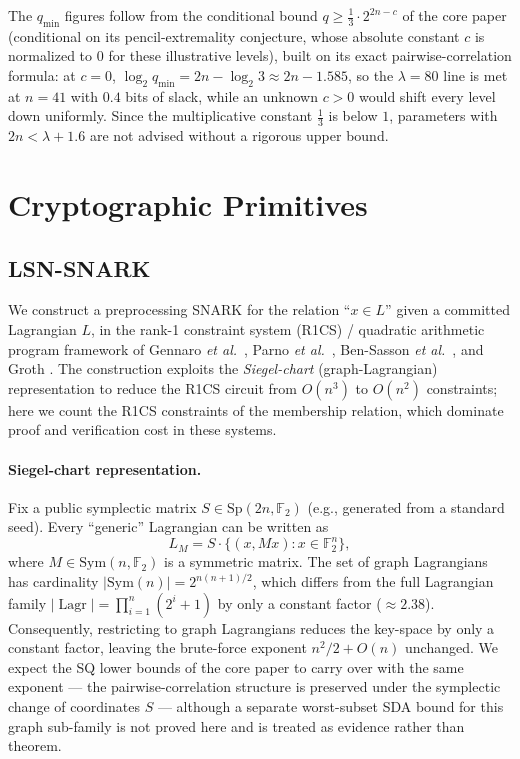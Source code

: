 \documentclass[11pt,a4paper]{article}
\theoremstyle{plain}
\theoremstyle{definition}
\newcommand{\F}{\mathbb{F}}
\DeclareMathOperator{\Lagr}{Lagr}
\newcommand{\etal}{\textit{et al.}}
\begin{document}
The $q_{\min}$ figures follow from the conditional bound $q \ge \tfrac13 \cdot 2^{2n-c}$ of the core paper (conditional on its pencil-extremality conjecture, whose absolute constant $c$ is normalized to $0$ for these illustrative levels), built on its exact pairwise-correlation formula: at $c=0$, $\log_2 q_{\min} = 2n - \log_2 3 \approx 2n - 1.585$, so the $\lambda=80$ line is met at $n=41$ with $0.4$ bits of slack, while an unknown $c>0$ would shift every level down uniformly. Since the multiplicative constant $\tfrac13$ is below $1$, parameters with $2n < \lambda + 1.6$ are not advised without a rigorous upper bound.

\section{Cryptographic Primitives}
\label{sec:primitives}

\subsection{LSN-SNARK}
\label{sec:snark}

We construct a preprocessing SNARK for the relation ``$x \in L$'' given a committed Lagrangian $L$, in the rank-1 constraint system (R1CS) / quadratic arithmetic program framework of Gennaro \etal\ \cite{GGPR13}, Parno \etal\ \cite{PHGR13}, Ben-Sasson \etal\ \cite{BCTV14}, and Groth \cite{Gro16}. The construction exploits the \emph{Siegel-chart} (graph-Lagrangian) representation to reduce the R1CS circuit from $O(n^3)$ to $O(n^2)$ constraints; here we count the R1CS constraints of the membership relation, which dominate proof and verification cost in these systems.

\paragraph{Siegel-chart representation.}
Fix a public symplectic matrix $S \in \mathrm{Sp}(2n,\F_2)$ (e.g., generated from a standard seed). Every ``generic'' Lagrangian can be written as
\[
L_M = S \cdot \{(x, Mx) : x \in \F_2^n\},
\]
where $M \in \mathrm{Sym}(n,\F_2)$ is a symmetric matrix. The set of graph Lagrangians has cardinality $|\mathrm{Sym}(n)| = 2^{n(n+1)/2}$, which differs from the full Lagrangian family $|\Lagr| = \prod_{i=1}^n (2^i+1)$ by only a constant factor ($\approx 2.38$). Consequently, restricting to graph Lagrangians reduces the key-space by only a constant factor, leaving the brute-force exponent $n^2/2+O(n)$ unchanged. We expect the SQ lower bounds of the core paper to carry over with the same exponent --- the pairwise-correlation structure is preserved under the symplectic change of coordinates $S$ --- although a separate worst-subset SDA bound for this graph sub-family is not proved here and is treated as evidence rather than theorem.
\end{document}
